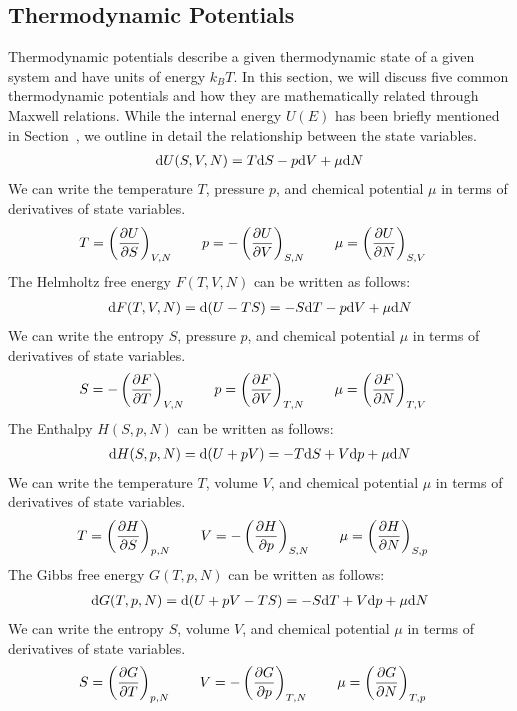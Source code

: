 \subsection{Thermodynamic Potentials}\label{potentials}
Thermodynamic potentials describe a given thermodynamic state of a given system and
have units of energy $k_BT$. In this section, we will discuss five common thermodynamic potentials and how they are mathematically related through Maxwell relations.
While the internal energy $U(E)$ has been briefly mentioned in Section~, we outline in detail the relationship between the state variables.
\begin{align}
    \text{d}U(S,V,N) = T\text{d}S-p\text{d}V+\mu\text{d}N
\end{align}
We can write the temperature $T$, pressure $p$, and chemical potential $\mu$ in terms of derivatives of state variables.
\begin{align}\label{maxU}
    T = \left( \pdv{U}{S}\right )_{V,N}  \quad\quad 
    p = -\left( \pdv{U}{V}\right )_{S,N}  \quad\quad 
    \mu = \left( \pdv{U}{N}\right )_{S,V}  \quad
\end{align}
The Helmholtz free energy $F(T,V,N)$ can be written as follows:
\begin{align}
    \text{d}F(T,V,N) = \text{d}(U-TS) = -S\text{d}T-p\text{d}V+\mu\text{d}N
\end{align}
We can write the entropy $S$, pressure $p$, and chemical potential $\mu$ in terms of derivatives of state variables.
\begin{align}\label{maxF}
    S = -\left( \pdv{F}{T}\right )_{V,N}  \quad\quad 
    p = \left( \pdv{F}{V}\right )_{T,N}  \quad\quad 
    \mu = \left( \pdv{F}{N}\right )_{T,V}  \quad
\end{align}
The Enthalpy $H(S,p,N)$ can be written as follows:
\begin{align}
    \text{d}H(S,p,N) = \text{d}(U+pV) = -T\text{d}S+V\text{d}p+\mu\text{d}N
\end{align}
We can write the temperature $T$, volume $V$, and chemical potential $\mu$ in terms of derivatives of state variables.
\begin{align}\label{maxH}
    T = \left( \pdv{H}{S}\right )_{p,N}  \quad\quad 
    V = -\left( \pdv{H}{p}\right )_{S,N}  \quad\quad 
    \mu = \left( \pdv{H}{N}\right )_{S,p}  \quad
\end{align}
The Gibbs free energy $G(T,p,N)$ can be written as follows:
\begin{align}
    \text{d}G(T,p,N) = \text{d}(U+pV-TS) = -S\text{d}T+V\text{d}p+\mu\text{d}N
\end{align}
We can write the entropy $S$, volume $V$, and chemical potential $\mu$ in terms of derivatives of state variables.
\begin{align}\label{maxG}
    S = \left( \pdv{G}{T}\right )_{p,N}  \quad\quad 
    V = -\left( \pdv{G}{p}\right )_{T,N}  \quad\quad 
    \mu = \left( \pdv{G}{N}\right )_{T,p}  \quad
\end{align}

